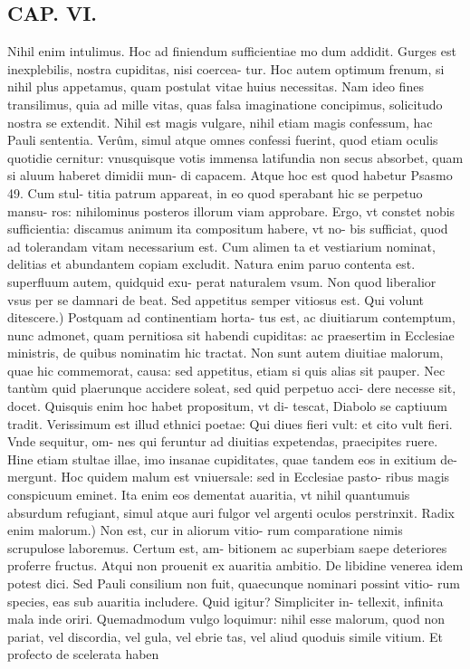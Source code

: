 \documentclass{article}
\begin{document}
\begin{pages}
\section*{CAP. VI. }
\marginpar{[ p.77. ]}\pstart Nihil enim intulimus. Hoc ad finiendum sufficientiae mo dum addidit. Gurges est inexplebilis, nostra cupiditas, nisi coercea- tur. Hoc autem optimum frenum, si nihil plus appetamus, quam postulat vitae huius necessitas. Nam ideo fines transilimus, quia ad mille vitas, quas falsa imaginatione concipimus, solicitudo nostra se extendit. Nihil est magis vulgare, nihil etiam magis confessum, hac Pauli sententia. Verûm, simul atque omnes confessi fuerint, quod etiam oculis quotidie cernitur: vnusquisque votis immensa latifundia non secus absorbet, quam si aluum haberet dimidii mun- di capacem. Atque hoc est quod habetur Psasmo 49. Cum stul- titia patrum appareat, in eo quod sperabant hic se perpetuo mansu- ros: nihilominus posteros illorum viam approbare. Ergo, vt constet nobis sufficientia: discamus animum ita compositum habere, vt no- bis sufficiat, quod ad tolerandam vitam necessarium est. Cum alimen ta et vestiarium nominat, delitias et abundantem copiam excludit. Natura enim paruo contenta est. superfluum autem, quidquid exu- perat naturalem vsum. Non quod liberalior vsus per se damnari de beat. Sed appetitus semper vitiosus est.  \pend\pstart Qui volunt ditescere.) Postquam ad continentiam horta- tus est, ac diuitiarum contemptum, nunc admonet, quam pernitiosa sit habendi cupiditas: ac praesertim in Ecclesiae ministris, de quibus nominatim hic tractat. Non sunt autem diuitiae malorum, quae hic commemorat, causa: sed appetitus, etiam si quis alias sit pauper. Nec tantùm quid plaerunque accidere soleat, sed quid perpetuo acci- dere necesse sit, docet. Quisquis enim hoc habet propositum, vt di- tescat, Diabolo se captiuum tradit. Verissimum est illud ethnici poetae: Qui diues fieri vult: et cito vult fieri. Vnde sequitur, om- nes qui feruntur ad diuitias expetendas, praecipites ruere. Hine etiam stultae illae, imo insanae cupiditates, quae tandem eos in exitium de- mergunt. Hoc quidem malum est vniuersale: sed in Ecclesiae pasto- ribus magis conspicuum eminet. Ita enim eos dementat auaritia, vt nihil quantumuis absurdum refugiant, simul atque auri fulgor vel argenti oculos perstrinxit.  \pend\pstart Radix enim malorum.) Non est, cur in aliorum vitio- rum comparatione nimis scrupulose laboremus. Certum est, am- bitionem ac superbiam saepe deteriores proferre fructus. Atqui non prouenit ex auaritia ambitio. De libidine venerea idem potest dici. Sed Pauli consilium non fuit, quaecunque nominari possint vitio- rum species, eas sub auaritia includere. Quid igitur? Simpliciter in- tellexit, infinita mala inde oriri. Quemadmodum vulgo loquimur: nihil esse malorum, quod non pariat, vel discordia, vel gula, vel ebrie tas, vel aliud quoduis simile vitium. Et profecto de scelerata haben  \pend

\end{pages}
\end{document}
